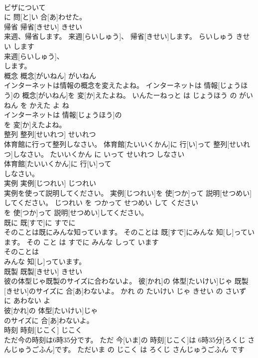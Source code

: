 \documentclass[8pt]{extreport}
\begin{document}
\begin{CJK}{UTF8}{min}
\\	ビザについて
\\	に 問[と]い 合[あ]わせた。			
\\	帰省	帰省[きせい]	きせい	
\\	来週、帰省します。	来週[らいしゅう]、 帰省[きせい]します。	らいしゅう きせい します	
\\	来週[らいしゅう]、
\\	します。			
\\	概念	概念[がいねん]	がいねん	
\\	インターネットは情報の概念を変えたよね。	インターネットは 情報[じょうほう]の 概念[がいねん]を 変[か]えたよね。	いんたーねっと は じょうほう の がいねん を かえた よ ね	
\\	インターネットは 情報[じょうほう]の
\\	を 変[か]えたよね。			
\\	整列	整列[せいれつ]	せいれつ	
\\	体育館に行って整列しなさい。	体育館[たいいくかん]に 行[い]って 整列[せいれつ]しなさい。	たいいくかん に いって せいれつ しなさい	
\\	体育館[たいいくかん]に 行[い]って
\\	しなさい。			
\\	実例	実例[じつれい]	じつれい	
\\	実例を使って説明してください。	実例[じつれい]を 使[つか]って 説明[せつめい]してください。	じつれい を つかって せつめい して ください	
\\	を 使[つか]って 説明[せつめい]してください。			
\\	既に	既[すで]に	すでに	
\\	そのことは既にみんな知っています。	そのことは 既[すで]にみんな 知[し]っています。	その こと は すでに みんな しって います	
\\	そのことは
\\	みんな 知[し]っています。			
\\	既製	既製[きせい]	きせい	
\\	彼の体型じゃ既製のサイズに合わないよ。	彼[かれ]の 体型[たいけい]じゃ 既製[きせい]のサイズに 合[あ]わないよ。	かれ の たいけい じゃ きせい の さいず に あわない よ	
\\	彼[かれ]の 体型[たいけい]じゃ
\\	のサイズに 合[あ]わないよ。			
\\	時刻	時刻[じこく]	じこく	
\\	ただ今の時刻は6時35分です。	ただ 今[いま]の 時刻[じこく]は 6時35分[ろくじ さんじゅうごふん]です。	ただいま の じこく は ろくじ さんじゅうごふん です	

\end{CJK}
\end{document}
